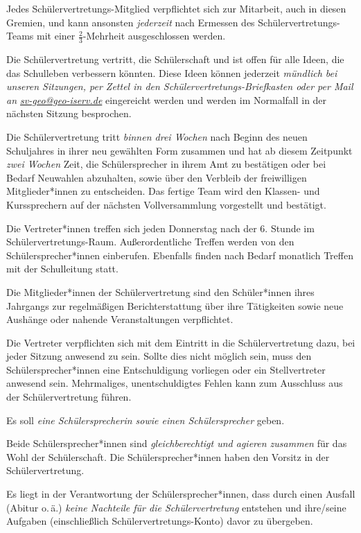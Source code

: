 \documentclass[10pt,a4paper,oneside,parskip=half]{scrartcl}
\begin{document}
\begin{contract}
Jedes Schülervertretungs-Mitglied verpflichtet sich zur Mitarbeit, auch in diesen Gremien, und kann ansonsten \emph{jederzeit} nach Ermessen des Schülervertretungs-Teams mit einer $\frac{2}{3}$-Mehrheit ausgeschlossen werden.
 
Die Schülervertretung vertritt, die Schülerschaft und ist offen für alle Ideen, die das Schulleben verbessern könnten. Diese Ideen können jederzeit \emph{mündlich bei unseren Sitzungen, per Zettel in den Schülervertretungs-Briefkasten oder per Mail an \href{mailto:sv-geo@geo-iserv.de}{sv-geo@geo-iserv.de}} eingereicht werden und werden im Normalfall in der nächsten Sitzung besprochen.

Die Schülervertretung tritt \emph{binnen drei Wochen} nach Beginn des neuen Schuljahres in ihrer neu gewählten Form zusammen und hat ab diesem Zeitpunkt \emph{zwei Wochen} Zeit, die Schülersprecher in ihrem Amt zu bestätigen oder bei Bedarf Neuwahlen abzuhalten, sowie über den Verbleib der freiwilligen Mitglieder*innen zu entscheiden. Das fertige Team wird den Klassen- und Kurssprechern auf der nächsten Vollversammlung vorgestellt und bestätigt.

Die Vertreter*innen treffen sich jeden Donnerstag nach der 6. Stunde im Schülervertretungs-Raum. Außerordentliche Treffen werden von den Schülersprecher*innen einberufen. Ebenfalls finden nach Bedarf monatlich Treffen mit der Schulleitung statt. 

Die Mitglieder*innen der Schülervertretung sind den Schüler*innen ihres Jahrgangs zur regelmäßigen Berichterstattung über ihre Tätigkeiten sowie neue Aushänge oder nahende Veranstaltungen verpflichtet.

Die Vertreter verpflichten sich mit dem Eintritt in die Schülervertretung dazu, bei jeder Sitzung anwesend zu sein. Sollte dies nicht möglich sein, muss den Schülersprecher*innen eine Entschuldigung vorliegen oder ein Stellvertreter anwesend sein. Mehrmaliges, unentschuldigtes Fehlen kann zum Ausschluss aus der Schülervertretung führen.

Es soll \emph{eine Schülersprecherin sowie einen Schülersprecher} geben.

Beide Schülersprecher*innen sind \emph{gleichberechtigt und agieren zusammen} für das Wohl der Schülerschaft. Die Schülersprecher*innen haben den Vorsitz in der Schülervertretung.

Es liegt in der Verantwortung der Schülersprecher*innen, dass durch einen Ausfall (Abitur o.\,ä.) \emph{keine Nachteile für die Schülervertretung} entstehen und ihre/seine Aufgaben (einschließlich Schülervertretungs-Konto) davor zu übergeben.


\end{contract}
\end{document}
